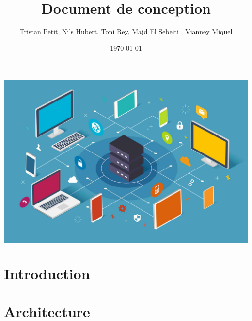 \documentclass{article}
\begin{document}
\title{Document de conception}
\author{Tristan Petit, Nils Hubert, Toni Rey, 
 Majd El Sebeiti , Vianney Miquel}
\date{\today}
\maketitle
\begin{center}
    \vspace{1cm} %
    \includegraphics[width=1\textwidth]{images/Logo-project.jpeg} %
\end{center}

\maketitle


\newpage


\renewcommand{\contentsname}{Table des matières}

\tableofcontents

\newpage
{}

\section{Introduction}


\section{Architecture}
\end{document}
